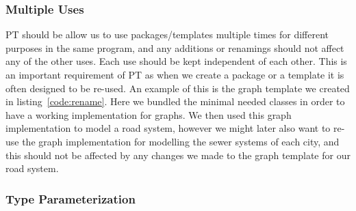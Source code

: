 \subsubsection{Multiple Uses}\label{subsubsec:multiple-uses}
%
PT should be allow us to use packages/templates multiple times for different purposes in the same program, and any additions or renamings should not affect any of the other uses.
Each use should be kept independent of each other.
This is an important requirement of PT as when we create a package or a template it is often designed to be re-used.
An example of this is the graph template we created in listing~\vref{code:rename}.
Here we bundled the minimal needed classes in order to have a working implementation for graphs.
We then used this graph implementation to model a road system, however we might later also want to re-use the graph implementation for modelling the sewer systems of each city, and this should not be affected by any changes we made to the graph template for our road system.

\subsubsection{Type Parameterization}\label{subsubsec:type-parameterization}

%


